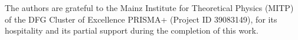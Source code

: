 \documentclass[12pt]{article}
\begin{document}
The authors are grateful to the Mainz Institute for Theoretical Physics (MITP)
of the DFG Cluster of Excellence PRISMA+ (Project ID 39083149), for its
hospitality and its partial support during the completion of this work.



\clearpage
%


\end{document}
